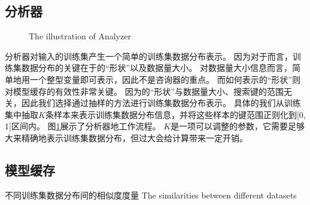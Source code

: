 
\subsection{分析器}

\begin{figure}[!htp]
  \centering
    {The illustration of Analyzer}
  \label{fig:analyzer}
\end{figure}

分析器对输入的训练集产生一个简单的训练集数据分布表示。
因为对于{\li}而言，训练集数据分布的关键在于{\cdf}的``形状''以及数据量大小。
对数据量大小信息而言，简单地用一个整型变量即可表示，因此不是咨询器的重点。
而如何表示{\cdf}的``形状''则对模型缓存的有效性非常关键。
因为{\cdf}的``形状''与数据量大小、搜索键的范围无关，因此我们选择通过抽样的方法进行训练集数据分布表示。
具体的我们从训练集中抽取$K$条样本来表示训练集数据分布信息，并将这些样本的键范围正则化到[0, 1]区间内。
图\ref{fig:analyzer}展示了分析器地工作流程。
$K$是一项可以调整的参数，它需要足够大来精确地表示训练集数据分布，但过大会给计算带来一定开销。


\subsection{模型缓存}

\begin{table}[!hpb]
  \centering
  \bicaption[不同训练集数据分布间的相似度度量]
    {不同训练集数据分布间的相似度度量}
    {The similarities between different datasets}
  \label{tab:similarity}
  \begin{tabular}{@{}llr@{}} \toprule
  \end{tabular}
\end{table}

